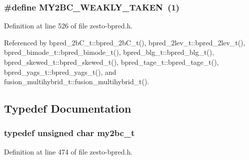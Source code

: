 \subsubsection[{MY2BC\_\-WEAKLY\_\-TAKEN}]{\setlength{\rightskip}{0pt plus 5cm}\#define MY2BC\_\-WEAKLY\_\-TAKEN~(1)}\label{zesto-bpred_8h_a3944e6a0db9efce75495ea792264ee0}




Definition at line 526 of file zesto-bpred.h.

Referenced by bpred\_\-2bC\_\-t::bpred\_\-2bC\_\-t(), bpred\_\-2lev\_\-t::bpred\_\-2lev\_\-t(), bpred\_\-bimode\_\-t::bpred\_\-bimode\_\-t(), bpred\_\-blg\_\-t::bpred\_\-blg\_\-t(), bpred\_\-skewed\_\-t::bpred\_\-skewed\_\-t(), bpred\_\-tage\_\-t::bpred\_\-tage\_\-t(), bpred\_\-yags\_\-t::bpred\_\-yags\_\-t(), and fusion\_\-multihybrid\_\-t::fusion\_\-multihybrid\_\-t().

\subsection{Typedef Documentation}
\subsubsection[{my2bc\_\-t}]{\setlength{\rightskip}{0pt plus 5cm}typedef unsigned char {\bf my2bc\_\-t}}\label{zesto-bpred_8h_bda9e00a2a6157fdad8ec356e7ba4820}




Definition at line 474 of file zesto-bpred.h.